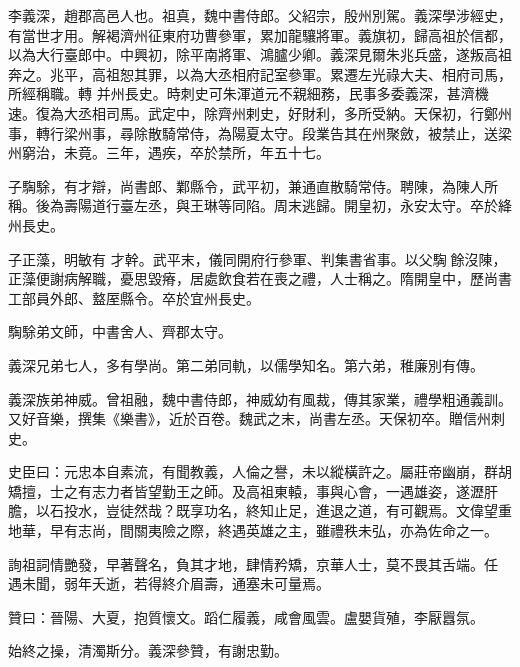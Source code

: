 \begin{pinyinscope}
 李義深，趙郡高邑人也。祖真，魏中書侍郎。父紹宗，殷州別駕。義深學涉經史，有當世才用。解褐濟州征東府功曹參軍，累加龍驤將軍。義旗初，歸高祖於信都，以為大行臺郎中。中興初，除平南將軍、鴻臚少卿。義深見爾朱兆兵盛，遂叛高祖奔之。兆平，高祖恕其罪，以為大丞相府記室參軍。累遷左光祿大夫、相府司馬，所經稱職。轉
 并州長史。時刺史可朱渾道元不親細務，民事多委義深，甚濟機速。復為大丞相司馬。武定中，除齊州剌史，好財利，多所受納。天保初，行鄭州事，轉行梁州事，尋除散騎常侍，為陽夏太守。段業告其在州聚斂，被禁止，送梁州窮治，未竟。三年，遇疾，卒於禁所，年五十七。



 子騊駼，有才辯，尚書郎、鄴縣令，武平初，兼通直散騎常侍。聘陳，為陳人所稱。後為壽陽道行臺左丞，與王琳等同陷。周末逃歸。開皇初，永安太守。卒於絳州長史。



 子正藻，明敏有
 才幹。武平末，儀同開府行參軍、判集書省事。以父騊餘沒陳，正藻便謝病解職，憂思毀瘠，居處飲食若在喪之禮，人士稱之。隋開皇中，歷尚書工部員外郎、盩厔縣令。卒於宜州長史。



 騊駼弟文師，中書舍人、齊郡太守。



 義深兄弟七人，多有學尚。第二弟同軌，以儒學知名。第六弟，稚廉別有傳。



 義深族弟神威。曾祖融，魏中書侍郎，神威幼有風裁，傳其家業，禮學粗通義訓。又好音樂，撰集《樂書》，近於百卷。魏武之末，尚書左丞。天保初卒。贈信州刺
 史。



 史臣曰：元忠本自素流，有聞教義，人倫之譽，未以縱橫許之。屬莊帝幽崩，群胡矯擅，士之有志力者皆望勤王之師。及高祖東轅，事與心會，一遇雄姿，遂瀝肝膽，以石投水，豈徒然哉？既享功名，終知止足，進退之道，有可觀焉。文偉望重地華，早有志尚，間關夷險之際，終遇英雄之主，雖禮秩未弘，亦為佐命之一。



 詢祖詞情艷發，早著聲名，負其才地，肆情矜矯，京華人士，莫不畏其舌端。任
 遇未聞，弱年夭逝，若得終介眉壽，通塞未可量焉。



 贊曰：晉陽、大夏，抱質懷文。蹈仁履義，咸會風雲。盧嬰貨殖，李厭囂氛。



 始終之操，清濁斯分。義深參贊，有謝忠勤。



\end{pinyinscope}